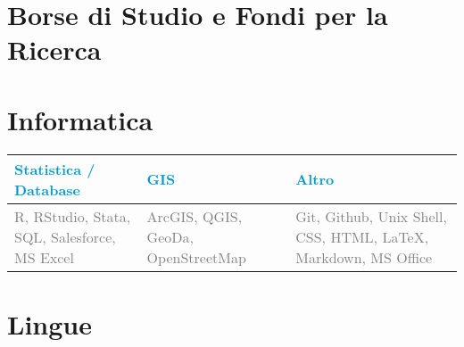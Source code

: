 \documentclass[11pt,a4paper,]{awesome-cv}
\begin{document}
\hypertarget{borse-di-studio-e-fondi-per-la-ricerca}{%
\section{\texorpdfstring{ Borse di Studio e Fondi per la
Ricerca}{ Borse di Studio e Fondi per la Ricerca}}\label{borse-di-studio-e-fondi-per-la-ricerca}}

\begin{cventries}
    \vspace{-4.0mm}
    \vspace{-4.0mm}
    \vspace{-4.0mm}
    \vspace{-4.0mm}
\end{cventries}

\hypertarget{informatica}{%
\section{\texorpdfstring{
Informatica}{ Informatica}}\label{informatica}}

\begin{table}[H]
\centering\begingroup\fontsize{10}{12}\selectfont

\begin{tabular}{>{\centering\arraybackslash}p{4.75cm}>{\centering\arraybackslash}p{4.75cm}>{\centering\arraybackslash}p{4.75cm}}
\toprule
\textcolor[HTML]{009acd}{\textbf{Statistica / Database}} & \textcolor[HTML]{009acd}{\textbf{GIS}} & \textcolor[HTML]{009acd}{\textbf{Altro}}\\
\midrule
\textcolor[HTML]{7f7f7f}{R, RStudio, Stata, SQL, Salesforce, MS Excel} & \textcolor[HTML]{7f7f7f}{ArcGIS, QGIS, GeoDa, OpenStreetMap} & \textcolor[HTML]{7f7f7f}{Git, Github, Unix Shell, CSS, HTML, LaTeX, Markdown, MS Office}\\
\bottomrule
\end{tabular}
\endgroup{}
\end{table}

\hypertarget{lingue}{%
\section{\texorpdfstring{ Lingue}{ Lingue}}\label{lingue}}
\end{document}

